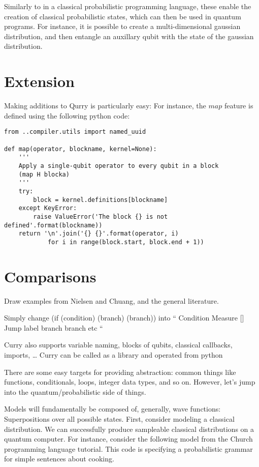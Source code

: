 \documentclass[journal]{IEEEtran}
\begin{document}
    Similarly to in a classical probabilistic programming language, these enable the creation of classical probabilistic states, which can then be used in quantum programs.
    For instance, it is possible to create a multi-dimensional gaussian distribution, and then entangle an auxillary qubit with the state of the gaussian distribution.

    \section{Extension}

    Making additions to Qurry is particularly easy:
    For instance, the $map$ feature is defined using the following python code:

    \begin{verbatim}
from ..compiler.utils import named_uuid

def map(operator, blockname, kernel=None):
    '''
    Apply a single-qubit operator to every qubit in a block
    (map H blocka)
    '''
    try:
        block = kernel.definitions[blockname]
    except KeyError:
        raise ValueError('The block {} is not defined'.format(blockname))
    return '\n'.join('{} {}'.format(operator, i)
            for i in range(block.start, block.end + 1))
    \end{verbatim}

\section{Comparisons}

    Draw examples from Nielsen and Chuang, and the general literature.

 Simply change (if (condition) (branch) (branch))
 into
 ``
 Condition
 Measure []
 Jump label
 branch
 branch etc
 ``
 
 Curry also supports variable naming, blocks of qubits, classical callbacks, imports, \dots
 Curry can be called as a library and operated from python
 
 There are some easy targets for providing abstraction: common things like functions, conditionals, loops, integer data types, and so on. 
 However, let's jump into the quantum/probabilistic side of things.
 
 Models will fundamentally be composed of, generally, wave functions: Superpositions over all possible states.
 First, consider modeling a classical distribution. 
 We can successfully produce sampleable classical distributions on a quantum computer.
 For instance, consider the following model from the Church programming language tutorial.
 This code is specifying a probabilistic grammar for simple sentences about cooking.
 
\end{document}
